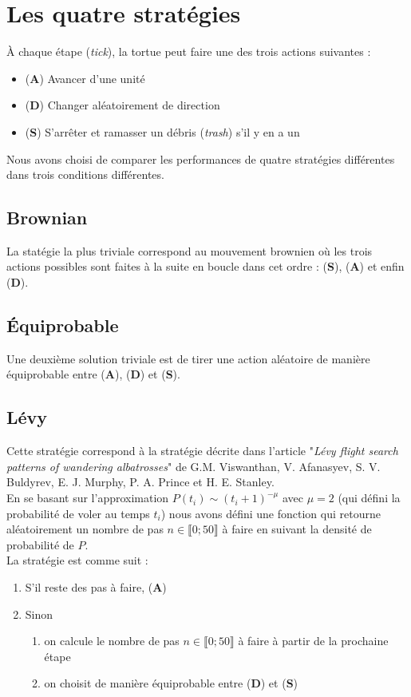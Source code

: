 \section{Les quatre stratégies}
\`{A} chaque étape (\emph{tick}), la tortue peut faire une des trois actions suivantes :
\begin{itemize}
\item (\textbf{A}) Avancer d'une unité
\item (\textbf{D}) Changer aléatoirement de direction
\item (\textbf{S}) S'arrêter et ramasser un débris (\emph{trash}) s'il y en a un
\end{itemize}
Nous avons choisi de comparer les performances de 
quatre stratégies différentes dans trois conditions différentes.

\subsection{Brownian}
La statégie la plus triviale correspond au mouvement brownien où les
trois actions possibles sont faites à la suite en boucle dans cet ordre :
(\textbf{S}), (\textbf{A}) et enfin (\textbf{D}).

\subsection{\'{E}quiprobable}
Une deuxième solution triviale est de tirer une action aléatoire de manière
équiprobable entre (\textbf{A}), (\textbf{D}) et (\textbf{S}).
\subsection{Lévy}
Cette stratégie correspond à la stratégie décrite dans l'article 
"\emph{Lévy flight search patterns of wandering albatrosses}" de 
G.M. Viswanthan, V. Afanasyev, S. V. Buldyrev, E. J. Murphy, 
P. A. Prince et H. E. Stanley. \\
En se basant sur l'approximation $P(t_i) \sim (t_i + 1)^{-\mu}$ avec $\mu = 2$
(qui défini la probabilité de voler au temps $t_i$) nous
avons défini une fonction qui retourne aléatoirement
un nombre de pas $n \in \llbracket 0; 50 \rrbracket$ à faire en suivant la densité de probabilité de $P$.\\
La stratégie est comme suit :
\begin{enumerate}
\item S'il reste des pas à faire, (\textbf{A})
\item Sinon 
\begin{enumerate}
\item on calcule le nombre de pas $n \in \llbracket 0; 50 \rrbracket$ à faire à partir de la prochaine étape
\item on choisit de manière équiprobable entre (\textbf{D}) et (\textbf{S})
\end{enumerate}
\end{enumerate}

